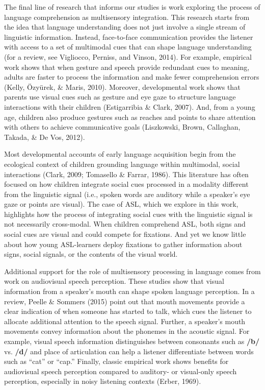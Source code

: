 \documentclass[oneside]{report}
\begin{document}
The final line of research that informs our studies is work exploring
the process of language comprehension as multisensory integration. This
research starts from the idea that language understanding does not just
involve a single stream of linguistic information. Instead, face-to-face
communication provides the listener with access to a set of multimodal
cues that can shape language understanding (for a review, see Vigliocco,
Perniss, and Vinson, 2014). For example, empirical work shows that when
gesture and speech provide redundant cues to meaning, adults are faster
to process the information and make fewer comprehension errors (Kelly,
Özyürek, \& Maris, 2010). Moreover, developmental work shows that
parents use visual cues such as gesture and eye gaze to structure
language interactions with their children (Estigarribia \& Clark, 2007).
And, from a young age, children also produce gestures such as reaches
and points to share attention with others to achieve communicative goals
(Liszkowski, Brown, Callaghan, Takada, \& De Vos, 2012).

Most developmental accounts of early language acquisition begin from the
ecological context of children grounding language within multimodal,
social interactions (Clark, 2009; Tomasello \& Farrar, 1986). This
literature has often focused on how children integrate social cues
processed in a modality different from the linguistic signal (i.e.,
spoken words are auditory while a speaker's eye gaze or points are
visual). The case of ASL, which we explore in this work, highlights how
the process of integrating social cues with the linguistic signal is not
necessarily cross-modal. When children comprehend ASL, both signs and
social cues are visual and could compete for fixations. And yet we know
little about how young ASL-learners deploy fixations to gather
information about signs, social signals, or the contents of the visual
world.

Additional support for the role of multisensory processing in language
comes from work on audiovisual speech perception. These studies show
that visual information from a speaker's mouth can shape spoken language
perception. In a review, Peelle \& Sommers (2015) point out that mouth
movements provide a clear indication of when someone has started to
talk, which cues the listener to allocate additional attention to the
speech signal. Further, a speaker's mouth movements convey information
about the phonemes in the acoustic signal. For example, visual speech
information distinguishes between consonants such as \textbf{/b/} vs.
\textbf{/d/} and place of articulation can help a listener differentiate
between words such as ``cat'' or ``cap.'' Finally, classic empirical
work shows benefits for audiovisual speech perception compared to
auditory- or visual-only speech perception, especially in noisy
listening contexts (Erber, 1969).
\end{document}
